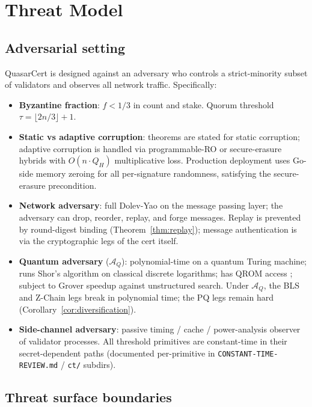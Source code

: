 \section{Threat Model}
\label{sec:threat}

\subsection{Adversarial setting}

QuasarCert is designed against an adversary who controls a
strict-minority subset of validators and observes all network
traffic. Specifically:

\begin{itemize}[leftmargin=2em,nosep]
\item \textbf{Byzantine fraction}: $f < 1/3$ in count and stake.
      Quorum threshold $\tau = \lfloor 2n/3 \rfloor + 1$.
\item \textbf{Static vs adaptive corruption}: theorems are stated for
      static corruption; adaptive corruption is handled via
      programmable-RO or secure-erasure hybrids
      \cite{fischlin2005} with $O(n \cdot Q_H)$ multiplicative loss.
      Production deployment uses Go-side memory zeroing for all
      per-signature randomness, satisfying the secure-erasure
      precondition.
\item \textbf{Network adversary}: full Dolev-Yao on the message
      passing layer; the adversary can drop, reorder, replay, and
      forge messages. Replay is prevented by round-digest binding
      (Theorem~\ref{thm:replay}); message authentication is via the
      cryptographic legs of the cert itself.
\item \textbf{Quantum adversary} ($\mathcal{A}_Q$): polynomial-time on
      a quantum Turing machine; runs Shor's algorithm on classical
      discrete logarithms; has QROM access \cite{bellare1993}; subject
      to Grover speedup against unstructured search. Under
      $\mathcal{A}_Q$, the BLS and Z-Chain legs break in polynomial
      time; the PQ legs remain hard
      (Corollary~\ref{cor:diversification}).
\item \textbf{Side-channel adversary}: passive timing / cache /
      power-analysis observer of validator processes. All threshold
      primitives are constant-time in their secret-dependent paths
      (documented per-primitive in \texttt{CONSTANT-TIME-REVIEW.md}
      / \texttt{ct/} subdirs).
\end{itemize}

\subsection{Threat surface boundaries}

